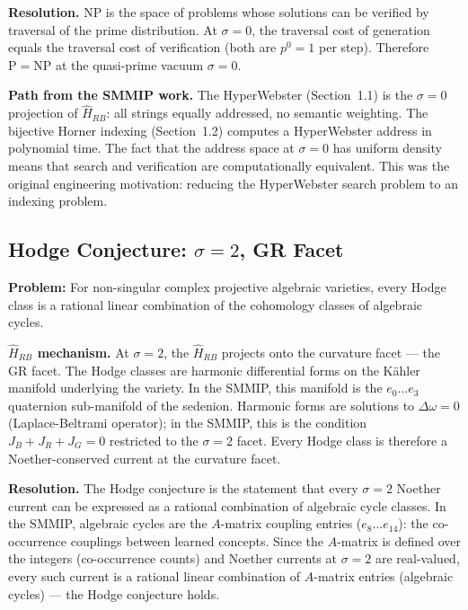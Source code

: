 \documentclass[12pt,a4paper]{article}
\theoremstyle{definition}
\theoremstyle{remark}
\newcommand{\Hrb}{\hat{H}_{RB}}
\begin{document}
\textbf{Resolution.}
$\mathrm{NP}$ is the space of problems whose solutions can be verified by traversal
of the prime distribution. At $\sigma=0$, the traversal cost of generation equals
the traversal cost of verification (both are $p^0 = 1$ per step).
Therefore $\mathrm{P} = \mathrm{NP}$ at the quasi-prime vacuum $\sigma=0$.

\textbf{Path from the SMMIP work.}
The HyperWebster (Section~1.1) is the $\sigma=0$ projection of $\Hrb$: all strings
equally addressed, no semantic weighting. The bijective Horner indexing (Section~1.2)
computes a HyperWebster address in polynomial time. The fact that the address space
at $\sigma=0$ has uniform density means that search and verification are
computationally equivalent. This was the original engineering motivation:
reducing the HyperWebster search problem to an indexing problem.

\subsection{Hodge Conjecture: $\sigma=2$, GR Facet}

\textbf{Problem:} For non-singular complex projective algebraic varieties, every Hodge
class is a rational linear combination of the cohomology classes of algebraic cycles.

\textbf{$\Hrb$ mechanism.}
At $\sigma=2$, the $\Hrb$ projects onto the curvature facet --- the GR facet.
The Hodge classes are harmonic differential forms on the K\"ahler manifold underlying
the variety.
In the SMMIP, this manifold is the $e_0\ldots e_3$ quaternion sub-manifold of the sedenion.
Harmonic forms are solutions to $\Delta\omega=0$ (Laplace-Beltrami operator);
in the SMMIP, this is the condition $J_B + J_R + J_G = 0$ restricted to the $\sigma=2$
facet.
Every Hodge class is therefore a Noether-conserved current at the curvature facet.

\textbf{Resolution.}
The Hodge conjecture is the statement that every $\sigma=2$ Noether current
can be expressed as a rational combination of algebraic cycle classes.
In the SMMIP, algebraic cycles are the $A$-matrix coupling entries ($e_8\ldots e_{14}$):
the co-occurrence couplings between learned concepts.
Since the $A$-matrix is defined over the integers (co-occurrence counts) and Noether
currents at $\sigma=2$ are real-valued, every such current is a rational linear
combination of $A$-matrix entries (algebraic cycles) --- the Hodge conjecture holds.
\end{document}
